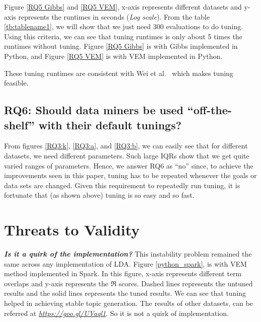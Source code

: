 \documentclass[conference]{IEEEtran}
\theoremstyle{break}
\begin{document}
Figure \ref{RQ5 Gibbs} and \ref{RQ5 VEM}, x-axis represents different datasets and y-axis represents the runtimes in seconds (\textit{Log scale}). From the table \ref{tb:tablename1}, we will show that we just need 300 evaluations to do tuning. Using this criteria, we can see that tuning runtimes is only about 5 times the runtimes without tuning. Figure \ref{RQ5 Gibbs} is with Gibbs implemented in Python, and Figure \ref{RQ5 VEM} is with VEM implemented in Python.

\begin{lesson}
These tuning runtimes are consistent with Wei et al.~\cite{fu2016tuning} which makes tuning feasible.
\end{lesson}

\subsection{\textbf{RQ6: Should data miners be used “off-the-shelf” with their  default  tunings?}}

From figures \ref{RQ3:k}, \ref{RQ3:a}, and \ref{RQ3:b}, we can easily see that for different datasets, we need different parameters. Such large IQRs show that we get quite varied ranges of parameters. Hence, we answer RQ6 as “no” since, to achieve the improvements seen in this paper, tuning has to be repeated whenever the goals or data sets are changed. Given this requirement to repeatedly run tuning, it is fortunate that (as shown above) tuning is so easy and so fast.

\section{Threats to Validity}
\label{sect: validity}

\textit{\textbf{Is it a quirk of the implementation?}} This instability problem remained the same across any implementation of LDA. Figure \ref{python_spark}, is with VEM method implemented in Spark. In this figure, x-axis represents different term overlaps and y-axis represents the $\Re$ scores. Dashed lines represents the untuned results and the solid lines represents the tuned results. We can see that tuning helped in achieving stable topic generation. The results of other datasets, can be referred at \href{https://goo.gl/UVaql1}{\textit{https://goo.gl/UVaql1}}. So it is not a quirk of implementation.
\end{document}
